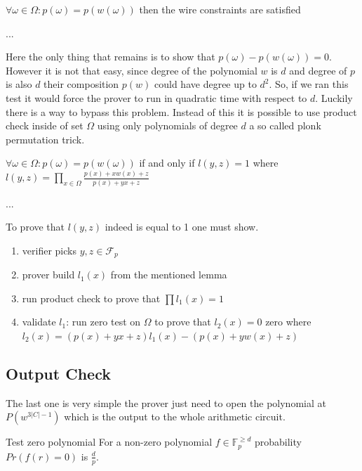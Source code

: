 \begin{theorem}
\label{theorem:wire-check}
    $\forall \omega \in \Omega: p(\omega) = p(w(\omega))$ then the wire constraints are satisfied
\end{theorem}

\begin{dukaz}
    ...
\end{dukaz}

Here the only thing that remains is to show that $p(\omega) - p(w(\omega)) = 0$. However it is not that easy, since degree of the polynomial $w$ is $d$ and degree of $p$ is also $d$ their composition $p(w)$ could have degree up to $d^2$. So, if we ran this test it would force the prover to run in quadratic time with respect to $d$. Luckily there is a way to bypass this problem. Instead of this it is possible to use product check inside of set $\Omega$ using only polynomials of degree $d$ a so called plonk permutation trick. 

\begin{lemma}
    $\forall \omega \in \Omega: p(\omega) = p(w(\omega))$ if and only if $l(y,z) = 1$ where $l(y , z) = \prod_{x \in \Omega} \frac{p(x)+xw(x)+z}{p(x)+yx+z}$
\end{lemma}

\begin{dukaz}
    ...
\end{dukaz}

To prove that $l(y, z)$ indeed is equal to 1 one must show.
\begin{enumerate}
    \item verifier picks $y, z \in \mathcal{F}_p$
    \item prover build $l_1(x)$ from the mentioned lemma
    \item run product check to prove that $\prod l_1(x) = 1$
    \item validate $l_1$: run zero test on $\Omega$ to prove that $l_2(x) = 0$ zero where $l_2(x) = (p(x)+yx+z)l_1(x) - (p(x)+yw(x)+z)$
\end{enumerate}

\subsection{Output Check}
The last one is very simple the prover just need to open the polynomial at $P(w^{3|C| -1})$ which is the output to the whole arithmetic circuit. 

\begin{lemma}{Test zero polynomial}
    For a non-zero polynomial $f \in \mathbb{F}_p^{\geq d}$ probability $Pr(f(r) = 0)$ is 
    $\frac{d}{p}$.
\end{lemma}

